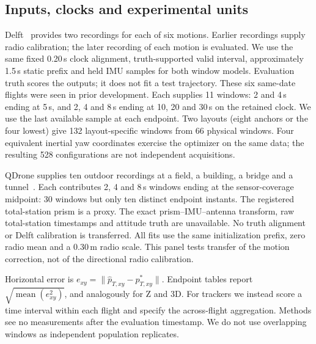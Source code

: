 \documentclass[conference,letterpaper,10pt]{IEEEtran}
\begin{document}
\subsection{Inputs, clocks and experimental units}
Delft~\cite{delftdata} provides two recordings for each of six motions. Earlier recordings supply radio calibration; the later recording of each motion is evaluated. We use the same fixed 0.20\,s clock alignment, truth-supported valid interval, approximately 1.5\,s static prefix and held IMU samples for both window models. Evaluation truth scores the outputs; it does not fit a test trajectory. These six same-date flights were seen in prior development. Each supplies 11 windows: 2 and 4\,s ending at 5\,s, and 2, 4 and 8\,s ending at 10, 20 and 30\,s on the retained clock. We use the last available sample at each endpoint. Two layouts (eight anchors or the four lowest) give 132 layout-specific windows from 66 physical windows. Four equivalent inertial yaw coordinates exercise the optimizer on the same data; the resulting 528 configurations are not independent acquisitions.

QDrone supplies ten outdoor recordings at a field, a building, a bridge and a tunnel~\cite{qdrone}. Each contributes 2, 4 and 8\,s windows ending at the sensor-coverage midpoint: 30 windows but only ten distinct endpoint instants. The registered total-station prism is a proxy. The exact prism--IMU--antenna transform, raw total-station timestamps and attitude truth are unavailable. No truth alignment or Delft calibration is transferred. All fits use the same initialization prefix, zero radio mean and a $0.30$\,m radio scale. This panel tests transfer of the motion correction, not of the directional radio calibration.

Horizontal error is $e_{xy}=\|\hat p_{T,xy}-p^*_{T,xy}\|$. Endpoint tables report $\sqrt{\operatorname{mean}(e_{xy}^2)}$, and analogously for Z and 3D. For trackers we instead score a time interval within each flight and specify the across-flight aggregation. Methods see no measurements after the evaluation timestamp. We do not use overlapping windows as independent population replicates.
\end{document}

